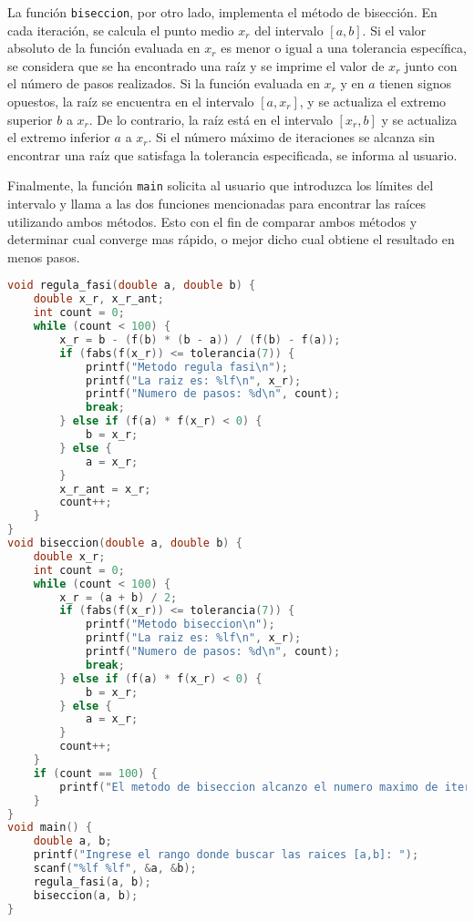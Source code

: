\documentclass[12pt]{article}
\begin{document}
La función \texttt{biseccion}, por otro lado, implementa el método de bisección. En cada iteración, se calcula el punto medio \(x_r\) del intervalo \([a,b]\). Si el valor absoluto de la función evaluada en \(x_r\) es menor o igual a una tolerancia específica, se considera que se ha encontrado una raíz y se imprime el valor de \(x_r\) junto con el número de pasos realizados. Si la función evaluada en \(x_r\) y en \(a\) tienen signos opuestos, la raíz se encuentra en el intervalo \([a, x_r]\), y se actualiza el extremo superior \(b\) a \(x_r\). De lo contrario, la raíz está en el intervalo \([x_r, b]\) y se actualiza el extremo inferior \(a\) a \(x_r\). Si el número máximo de iteraciones se alcanza sin encontrar una raíz que satisfaga la tolerancia especificada, se informa al usuario.

Finalmente, la función \texttt{main} solicita al usuario que introduzca los límites del intervalo y llama a las dos funciones mencionadas para encontrar las raíces utilizando ambos métodos. Esto con el fin de comparar ambos métodos y determinar cual converge mas rápido, o mejor dicho cual obtiene el resultado en menos pasos.\\ 

\begin{lstlisting}[language=C, caption={Problema 3.}, style=mystyle]
void regula_fasi(double a, double b) {
    double x_r, x_r_ant;
    int count = 0;
    while (count < 100) {
        x_r = b - (f(b) * (b - a)) / (f(b) - f(a));
        if (fabs(f(x_r)) <= tolerancia(7)) {
            printf("Metodo regula fasi\n");
            printf("La raiz es: %lf\n", x_r);
            printf("Numero de pasos: %d\n", count);
            break;
        } else if (f(a) * f(x_r) < 0) {
            b = x_r;
        } else {
            a = x_r;
        }
        x_r_ant = x_r;
        count++;
    }    
}
void biseccion(double a, double b) {
    double x_r;
    int count = 0;
    while (count < 100) {
        x_r = (a + b) / 2;
        if (fabs(f(x_r)) <= tolerancia(7)) {
            printf("Metodo biseccion\n");
            printf("La raiz es: %lf\n", x_r);
            printf("Numero de pasos: %d\n", count);
            break;
        } else if (f(a) * f(x_r) < 0) {
            b = x_r;
        } else {
            a = x_r;
        }
        count++;
    }
    if (count == 100) {
        printf("El metodo de biseccion alcanzo el numero maximo de iteraciones sin convergencia.\n");
    }
}
void main() {
    double a, b;
    printf("Ingrese el rango donde buscar las raices [a,b]: ");
    scanf("%lf %lf", &a, &b);
    regula_fasi(a, b);
    biseccion(a, b);
}
    \end{lstlisting}
\end{document}
